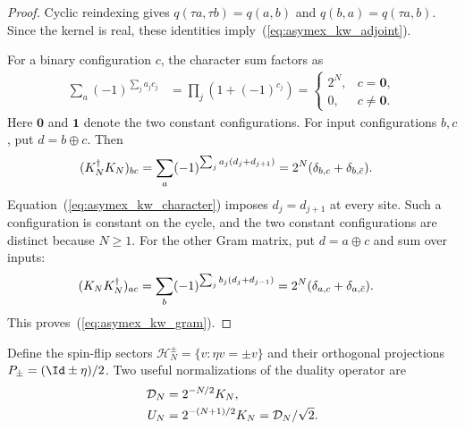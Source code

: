 \begin{proof}
    \leanok
    Cyclic reindexing gives $q(\tau a,\tau b)=q(a,b)$ and
    $q(b,a)=q(\tau a,b)$. Since the kernel is real, these identities
    imply~(\ref{eq:asymex_kw_adjoint}).

    For a binary configuration $c$, the character sum factors as
    \begin{align}
        \sum_a(-1)^{\sum_ja_jc_j}
         & =\prod_j(1+(-1)^{c_j})
        =\begin{cases}
             2^N, & c=\mathbf0,    \\
             0,   & c\neq\mathbf0.
         \end{cases}
        \label{eq:asymex_kw_character}
    \end{align}
    Here $\mathbf0$ and $\mathbf1$ denote the two constant configurations.
    For input configurations $b,c$, put $d=b\oplus c$. Then
    \begin{align}
        (K_N^\dagger K_N)_{bc}
         & =\sum_a(-1)^{\sum_ja_j(d_j+d_{j+1})}
        =2^N(\delta_{b,c}+\delta_{b,\bar c}).
        \notag
    \end{align}
    Equation~(\ref{eq:asymex_kw_character}) imposes $d_j=d_{j+1}$ at
    every site. Such a configuration is constant on the cycle, and
    the two constant configurations are distinct because $N\geq1$.
    For the other Gram matrix, put $d=a\oplus c$ and sum over inputs:
    \begin{align}
        (K_NK_N^\dagger)_{ac}
         & =\sum_b(-1)^{\sum_jb_j(d_j+d_{j-1})}
        =2^N(\delta_{a,c}+\delta_{a,\bar c}).
        \notag
    \end{align}
    This proves~(\ref{eq:asymex_kw_gram}).
\end{proof}

Define the spin-flip sectors $\mathcal H_N^\pm=\{v:\eta v=\pm v\}$ and
their orthogonal projections $P_\pm=(\Id\pm\eta)/2$. Two useful
normalizations of the duality operator are
\begin{align}
    \mathcal D_N & =2^{-N/2}K_N,
    \notag                                               \\
    U_N          & =2^{-(N+1)/2}K_N=\mathcal D_N/\sqrt2.
    \label{eq:asymex_kw_normalizations}
\end{align}

